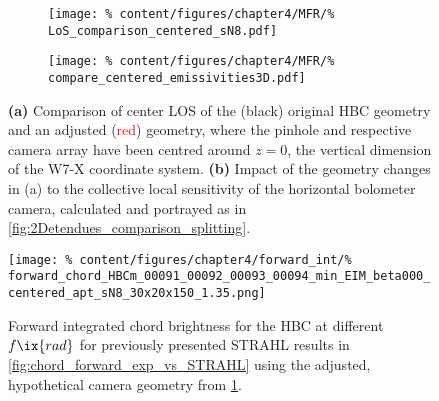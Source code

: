             \begin{figure}[t]%
                \centering%
                \begin{subfigure}{0.4\textwidth}%
                    \texttt{[image: \%
                        content/figures/chapter4/MFR/\%
                        LoS\_comparison\_centered\_sN8.pdf]}%
                    \caption{}%
                \end{subfigure}%
                \hfill%
                \begin{subfigure}{0.55\textwidth}%
                    \texttt{[image: \%
                        content/figures/chapter4/MFR/\%
                        compare\_centered\_emissivities3D.pdf]}%
                    \caption{}%
                \end{subfigure}%
                \caption{\textbf{(a)} Comparison of center LOS of the (black) original HBC geometry and an adjusted (\textcolor{red}{red}) geometry, where the pinhole and respective camera array have been centred around $z=0$, the vertical dimension of the W7-X coordinate system. \textbf{(b)} Impact of the geometry changes in (a) to the collective local sensitivity of the horizontal bolometer camera, calculated and portrayed as in \cref{fig:2Detendues_comparison_splitting}.}\label{fig:geometry_change_centered}%
            \end{figure}%
%
            \begin{figure}[t]%
                \centering%
                \texttt{[image: \%
                    content/figures/chapter4/forward\_int/\%
                    forward\_chord\_HBCm\_00091\_00092\_00093\_00094\_min\_EIM\_beta000\_centered\_apt\_sN8\_30x20x150\_1.35.png]}%
                \caption{Forward integrated chord brightness for the HBC at different $f\ix{rad}$ for previously presented STRAHL results in \cref{fig:chord_forward_exp_vs_STRAHL} using the adjusted, hypothetical camera geometry from \cref{fig:geometry_change_centered}.}\label{fig:forward_intSTRAHL_centered}%
            \end{figure}%
%
